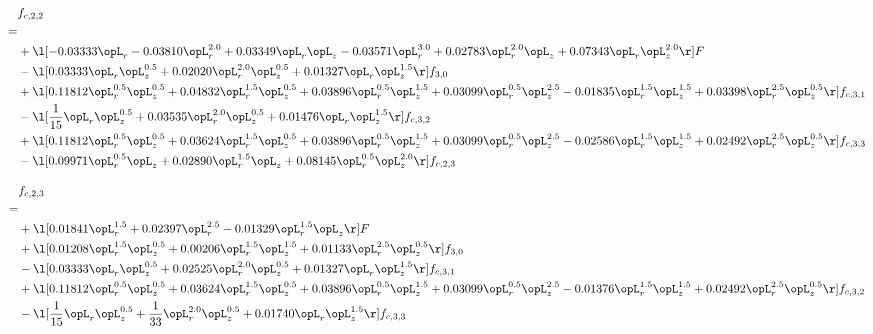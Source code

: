 \begin{alignat}{2} 
\label{eq:f_22_2} 
& f_{c,2,2} \nonumber \\ 
 = \\ 
& + \l[  -0.03333 \opL_r   -0.03810 \opL_r^{2.0} +  0.03349 \opL_r \opL_z   -0.03571 \opL_r^{3.0} +  0.02783 \opL_r^{2.0} \opL_z +  0.07343 \opL_r \opL_z^{2.0}  \r] F \nonumber \\ 
& - \l[  0.03333 \opL_r \opL_z^{0.5} +  0.02020 \opL_r^{2.0} \opL_z^{0.5} +  0.01327 \opL_r \opL_z^{1.5}  \r] f_{3,0} \nonumber \\ 
& + \l[  0.11812 \opL_r^{0.5} \opL_z^{0.5} +  0.04832 \opL_r^{1.5} \opL_z^{0.5} +  0.03896 \opL_r^{0.5} \opL_z^{1.5} +  0.03099 \opL_r^{0.5} \opL_z^{2.5}   -0.01835 \opL_r^{1.5} \opL_z^{1.5} +  0.03398 \opL_r^{2.5} \opL_z^{0.5}  \r] f_{c,3,1} \nonumber \\ 
& - \l[ \frac{1}{15} \opL_r \opL_z^{0.5} +  0.03535 \opL_r^{2.0} \opL_z^{0.5} +  0.01476 \opL_r \opL_z^{1.5}  \r] f_{c,3,2} \nonumber \\ 
& + \l[  0.11812 \opL_r^{0.5} \opL_z^{0.5} +  0.03624 \opL_r^{1.5} \opL_z^{0.5} +  0.03896 \opL_r^{0.5} \opL_z^{1.5} +  0.03099 \opL_r^{0.5} \opL_z^{2.5}   -0.02586 \opL_r^{1.5} \opL_z^{1.5} +  0.02492 \opL_r^{2.5} \opL_z^{0.5}  \r] f_{c,3,3} \nonumber \\ 
& - \l[  0.09971 \opL_r^{0.5} \opL_z +  0.02890 \opL_r^{1.5} \opL_z +  0.08145 \opL_r^{0.5} \opL_z^{2.0}  \r] f_{c,2,3} \nonumber \\ 
\end{alignat} 


\begin{alignat}{2} 
\label{eq:f_23_2} 
& f_{c,2,3} \nonumber \\ 
 = \\ 
& + \l[  0.01841 \opL_r^{1.5} +  0.02397 \opL_r^{2.5}   -0.01329 \opL_r^{1.5} \opL_z  \r] F \nonumber \\ 
& + \l[  0.01208 \opL_r^{1.5} \opL_z^{0.5} +  0.00206 \opL_r^{1.5} \opL_z^{1.5} +  0.01133 \opL_r^{2.5} \opL_z^{0.5}  \r] f_{3,0} \nonumber \\ 
& - \l[  0.03333 \opL_r \opL_z^{0.5} +  0.02525 \opL_r^{2.0} \opL_z^{0.5} +  0.01327 \opL_r \opL_z^{1.5}  \r] f_{c,3,1} \nonumber \\ 
& + \l[  0.11812 \opL_r^{0.5} \opL_z^{0.5} +  0.03624 \opL_r^{1.5} \opL_z^{0.5} +  0.03896 \opL_r^{0.5} \opL_z^{1.5} +  0.03099 \opL_r^{0.5} \opL_z^{2.5}   -0.01376 \opL_r^{1.5} \opL_z^{1.5} +  0.02492 \opL_r^{2.5} \opL_z^{0.5}  \r] f_{c,3,2} \nonumber \\ 
& - \l[ \frac{1}{15} \opL_r \opL_z^{0.5} + \frac{1}{33} \opL_r^{2.0} \opL_z^{0.5} +  0.01740 \opL_r \opL_z^{1.5}  \r] f_{c,3,3} \nonumber \\ 
\end{alignat} 


